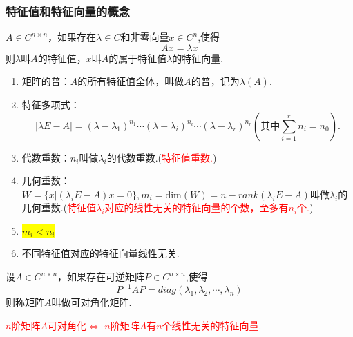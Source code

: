 \subsubsection{特征值和特征向量的概念}
\begin{definition}
$A\in C^{n\times n}$，如果存在$\lambda \in C$和非零向量$x \in C^n$,使得
\[
Ax=\lambda x
\]
则$\lambda$叫$A$的特征值，$x$叫$A$的属于特征值$\lambda$的特征向量.

\end{definition}
\begin{note}
\begin{enumerate}
	\item \textcolor{ecolor}{矩阵的普：}$A$的所有特征值全体，叫做$A$的普，记为$\lambda(A).$
	\item \textcolor{ecolor}{特征多项式：}
	\[
	|\lambda E-A|=\left(\lambda-\lambda_{1}\right)^{n_{1}} \cdots\left(\lambda-\lambda_{i}\right)^{n_{i}} \cdots\left(\lambda-\lambda_{r}\right)^{n_{r}}
	 \left(\mbox{其中}\sum_{i=1}^{r} n_{i}=n_{0}\right).
	\]
	\item  \textcolor{ecolor}{代数重数：}$n_i$叫做$\lambda_i$的代数重数.(\textcolor{red}{特征值重数.})
	\item  \textcolor{ecolor}{几何重数：}$W=\{x|(\lambda_iE-A)x=0\}, m_i=\mathrm{dim}(W)=n-rank(\lambda_iE-A)$叫做$\lambda_i$的几何重数.(\textcolor{red}{特征值$\lambda_i$对应的线性无关的特征向量的个数，至多有$n_i$个.})
	\item \colorbox{yellow}{$m_i<n_i$}
	\item  \textcolor{ecolor}{不同特征值对应的特征向量线性无关.}
\end{enumerate}
\end{note}

\begin{definition}
	设$A\in C^{n\times n}$，如果存在可逆矩阵$P\in C^{n\times n}$,使得
	\[
	P^{-1}AP=diag(\lambda_1,\lambda_2,\cdots,\lambda_n)
	\]
	则称矩阵$A$叫做可对角化矩阵.
	
\end{definition}

\begin{note}
	\textcolor{red}{$n$阶矩阵$A$可对角化$\Leftrightarrow$ $n$阶矩阵$A$有$n$个线性无关的特征向量.}
\end{note}

